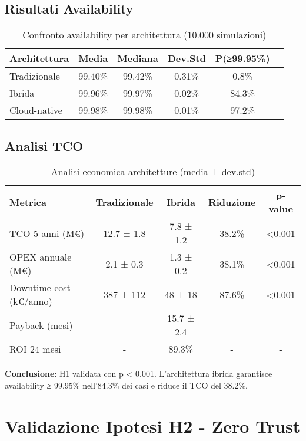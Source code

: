 \subsection{\texorpdfstring{Risultati Availability}{C.1.1 - Risultati Availability}}

\begin{table}[htbp]
\centering
\begin{tabular}{lccccc}
\toprule
\textbf{Architettura} & \textbf{Media} & \textbf{Mediana} & \textbf{Dev.Std} & \textbf{P(≥99.95\%)} \\
\midrule
Tradizionale & 99.40\% & 99.42\% & 0.31\% & 0.8\% \\
Ibrida & 99.96\% & 99.97\% & 0.02\% & 84.3\% \\
Cloud-native & 99.98\% & 99.98\% & 0.01\% & 97.2\% \\
\bottomrule
\end{tabular}
\caption{Confronto availability per architettura (10.000 simulazioni)}
\end{table}

\subsection{\texorpdfstring{Analisi TCO}{C.1.2 - Analisi TCO}}

\begin{table}[htbp]
\centering
\begin{tabular}{lcccc}
\toprule
\textbf{Metrica} & \textbf{Tradizionale} & \textbf{Ibrida} & \textbf{Riduzione} & \textbf{p-value} \\
\midrule
TCO 5 anni (M€) & 12.7 ± 1.8 & 7.8 ± 1.2 & 38.2\% & <0.001 \\
OPEX annuale (M€) & 2.1 ± 0.3 & 1.3 ± 0.2 & 38.1\% & <0.001 \\
Downtime cost (k€/anno) & 387 ± 112 & 48 ± 18 & 87.6\% & <0.001 \\
Payback (mesi) & - & 15.7 ± 2.4 & - & - \\
ROI 24 mesi & - & 89.3\% & - & - \\
\bottomrule
\end{tabular}
\caption{Analisi economica architetture (media ± dev.std)}
\end{table}

\textbf{Conclusione}: H1 validata con p < 0.001. L'architettura ibrida garantisce availability ≥ 99.95\% nell'84.3\% dei casi e riduce il TCO del 38.2\%.

\section{\texorpdfstring{Validazione Ipotesi H2 - Zero Trust}{C.2 - Validazione Ipotesi H2 - Zero Trust}}


